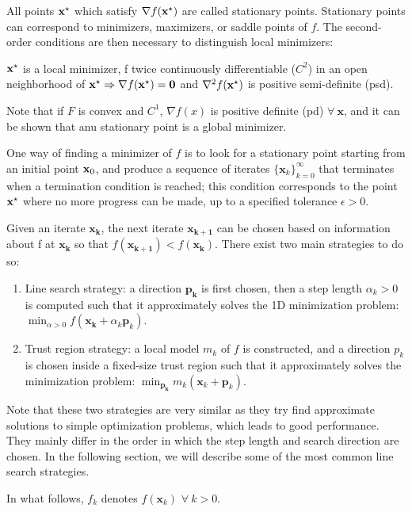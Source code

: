 All points $\mathbf{x}^{\star}$ which satisfy $\nabla f(\mathbf{x}^{\star})$ are called
stationary points. Stationary points can correspond to minimizers,
maximizers, or saddle points of $f$. The second-order conditions are
then necessary to distinguish local minimizers:

$\mathbf{x}^{\star}$ is a local minimizer, f twice continuously differentiable
($C^2$) in an open neighborhood of $\mathbf{x}^{\star} \Rightarrow \nabla
f(\mathbf{x}^{\star}) = \mathbf{0}$ and $\nabla^2 f(\mathbf{x}^{\star})$ is positive
semi-definite (psd).

Note that if $F$ is convex and $C^1$, $\nabla f(x)$ is positive
definite (pd) $\forall~\mathbf{x}$, and it can be shown that anu
stationary point is a global minimizer.

One way of finding a minimizer of $f$ is to look for a stationary
point starting from an initial point $\mathbf{x}_0$, and produce a
sequence of iterates $\{\mathbf{x}_k\}_{k=0}^{\infty}$ that terminates
when a termination condition is reached; this condition corresponds to
the point $\mathbf{x}^{\star}$ where no more progress can be made, up to a
specified tolerance $\epsilon > 0$.

Given an iterate $\mathbf{x_k}$, the next iterate $\mathbf{x_{k+1}}$
can be chosen based on information about f at $\mathbf{x_k}$ so that
$f(\mathbf{x_{k+1}})<f(\mathbf{x_k})$. There exist two main strategies
to do so:

\begin{enumerate}
\item Line search strategy: a direction $\mathbf{p_k}$ is first
  chosen, then a step length $\alpha_k > 0$ is computed such that it
  approximately solves the 1D minimization problem: $\min_{\alpha>0}
  f(\mathbf{x_k}+\alpha_k\mathbf{p}_k)$.
\item Trust region strategy: a local model $m_k$ of $f$ is
  constructed, and a direction $p_k$ is chosen inside a fixed-size
  trust region such that it approximately solves the minimization
  problem: $\min_{\mathbf{p_k}} m_k(\mathbf{x}_k+\mathbf{p}_k)$.
\end{enumerate}

Note that these two strategies are very similar as they try find
approximate solutions to simple optimization problems, which leads to
good performance. They mainly differ in the order in which the step
length and search direction are chosen. In the following section, we
will describe some of the most common line search strategies.

In what follows, $f_k$ denotes $f(\mathbf{x}_k)$ $\forall~k > 0$.

